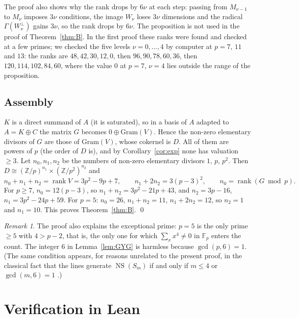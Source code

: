 \documentclass[11pt]{article}
\theoremstyle{definition}
\theoremstyle{remark}
\newtheorem{remark}[theorem]{Remark}
\newcommand{\Z}{\mathbb{Z}}
\newcommand{\F}{\mathbb{F}}
\newcommand{\NS}{\operatorname{NS}}
\begin{document}
The proof also shows why the rank drops by $6\nu$ at each step: passing from $M_{\nu-1}$ to $M_\nu$ imposes $3\nu$ conditions, the image $W_\nu$ loses $3\nu$ dimensions and the radical $\Gamma(W_\nu^\perp)$ gains $3\nu$, so the rank drops by $6\nu$. The proposition is not used in the proof of Theorem~\ref{thm:B}. In the first proof \cite{DL} these ranks were found and checked at a few primes; we checked the five levels $\nu=0,\dots,4$ by computer at $p=7$, $11$ and $13$: the ranks are $48,42,30,12,0$, then $96,90,78,60,36$, then $120,114,102,84,60$, where the value $0$ at $p=7$, $\nu=4$ lies outside the range of the proposition.

\subsection{Assembly}

$K$ is a direct summand of $A$ (it is saturated), so in a basis of $A$ adapted to $A=K\oplus C$ the matrix $G$ becomes $0\oplus\mathrm{Gram}(V)$. Hence the non-zero elementary divisors of $G$ are those of $\mathrm{Gram}(V)$, whose cokernel is $D$. All of them are powers of $p$ (the order of $D$ is), and by Corollary~\ref{cor:exp} none has valuation $\ge3$. Let $n_0,n_1,n_2$ be the numbers of non-zero elementary divisors $1$, $p$, $p^2$. Then $D\cong(\Z/p)^{n_1}\times(\Z/p^2)^{n_2}$ and
\[
n_0+n_1+n_2=\operatorname{rank}V=3p^2-9p+7,\qquad n_1+2n_2=3(p-3)^2,\qquad n_0=\operatorname{rank}(G\bmod p).
\]
For $p\ge7$, $n_0=12(p-3)$, so $n_1+n_2=3p^2-21p+43$, and $n_2=3p-16$, $n_1=3p^2-24p+59$. For $p=5$: $n_0=26$, $n_1+n_2=11$, $n_1+2n_2=12$, so $n_2=1$ and $n_1=10$. This proves Theorem~\ref{thm:B}. \qed

\begin{remark}
The proof also explains the exceptional prime: $p=5$ is the only prime $\ge5$ with $4>p-2$, that is, the only one for which $\sum_xx^4\ne0$ in $\F_p$ enters the count. The integer $6$ in Lemma~\ref{lem:GYG} is harmless because $\gcd(p,6)=1$. (The same condition appears, for reasons unrelated to the present proof, in the classical fact that the lines generate $\NS(S_m)$ if and only if $m\le4$ or $\gcd(m,6)=1$ \cite{Sh82,Deg}.)
\end{remark}

\section{Verification in Lean}\label{sec:lean}
\end{document}
